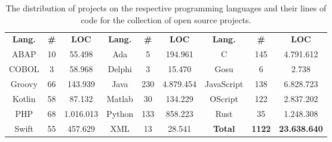 \setlength{\extrarowheight}{.5em}
\begin{table}
	\caption[Overview over the open source projects.]{The distribution of projects on the respective programming languages and their lines of code for the collection of open source projects.}
	\label{table:gitProjects}
	\begin{tabularx}{\textwidth}{c|c|c|c|c|c|c|c|c}
		\textbf{Lang.} & \textbf{\#} & \textbf{LOC} &\textbf{Lang.} & \textbf{\#} & \textbf{LOC} &\textbf{Lang.} & \textbf{\#} & \textbf{LOC} \\
		ABAP & 10 & 55.498 &
		Ada & 5 & 194.961 &
		C & 145 & 4.791.612 \\
		COBOL & 3 & 58.968 &
		Delphi & 3 & 15.470 &
		Gosu & 6 & 2.738 \\
		Groovy & 66 & 143.939 &
		Java & 230 & 4.879.454 &
		JavaScript & 138 & 6.828.723 \\
		Kotlin & 58 & 87.132 &
		Matlab & 30 & 134.229 &
		OScript & 122 & 2.837.202 \\
		PHP & 68 & 1.016.013 &
		Python & 133 & 858.223 &
		Rust & 35 & 1.248.308 \\
		Swift & 55 & 457.629 &
		XML & 13 & 28.541 &
		\textbf{Total} & \textbf{1122} & \textbf{23.638.640}
		
	\end{tabularx}
\end{table}
\setlength{\extrarowheight}{0em}